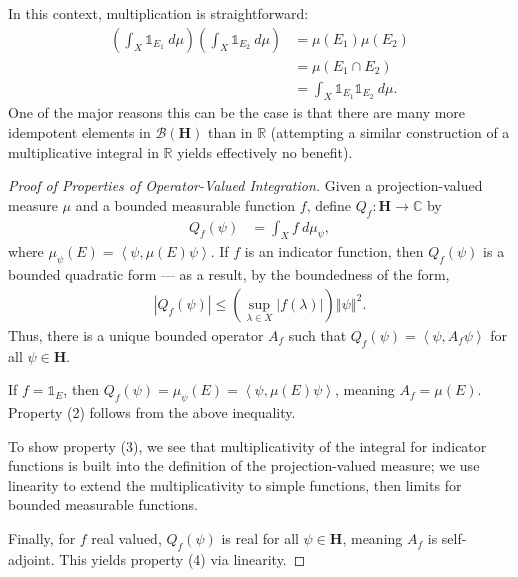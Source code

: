 \documentclass[12pt]{extarticle}
\newcommand{\R}{\mathbb{R}}
\newcommand{\C}{\mathbb{C}}
\newcommand{\iprod}[2]{\left\langle #1,#2\right\rangle}
\newcommand{\norm}[1]{\left\Vert #1\right\Vert}
\theoremstyle{plain}
\theoremstyle{definition}
\theoremstyle{remark}
\renewcommand{\newline}{\hfill\break}
\begin{document}
  In this context, multiplication is straightforward:
  \begin{align*}
    \left(\int_{X}^{} \mathbb{1}_{E_1}\:d\mu\right)\left(\int_{X}^{} \mathbb{1}_{E_2}\:d\mu\right) &= \mu(E_1)\mu(E_2)\\
                                                                                                   &= \mu(E_1 \cap E_2)\\
                                                                                                   &= \int_{X}^{} \mathbb{1}_{E_1}\mathbb{1}_{E_2}\:d\mu.
  \end{align*}
  One of the major reasons this can be the case is that there are many more idempotent elements in $\mathcal{B}(\mathbf{H})$ than in $\R$ (attempting a similar construction of a multiplicative integral in $\R$ yields effectively no benefit).
  \begin{proof}[Proof of Properties of Operator-Valued Integration]
    Given a projection-valued measure $\mu$ and a bounded measurable function $f$, define $Q_{f}: \mathbf{H}\rightarrow \C$ by
    \begin{align*}
      Q_f(\psi) &= \int_{X}^{}f \:d\mu_{\psi},
    \end{align*}
    where $\mu_{\psi}(E) = \iprod{\psi}{\mu(E)\psi}$. If $f$ is an indicator function, then $Q_f(\psi)$ is a bounded quadratic form --- as a result, by the boundedness of the form,
    \begin{align*}
      |Q_f(\psi)| \leq \left(\sup_{\lambda \in X}|f(\lambda)|\right)\norm{\psi}^2.
    \end{align*}
    Thus, there is a unique bounded operator $A_f$ such that $Q_f(\psi) = \iprod{\psi}{A_f\psi}$ for all $\psi \in \mathbf{H}$.\newline

    If $f = \mathbb{1}_E$, then $Q_f(\psi) = \mu_{\psi}(E) = \iprod{\psi}{\mu(E)\psi}$, meaning $A_f = \mu(E)$. Property (2) follows from the above inequality.\newline

    To show property (3), we see that multiplicativity of the integral for indicator functions is built into the definition of the projection-valued measure; we use linearity to extend the multiplicativity to simple functions, then limits for bounded measurable functions.\newline

    Finally, for $f$ real valued, $Q_f(\psi)$ is real for all $\psi \in \mathbf{H}$, meaning $A_f$ is self-adjoint. This yields property (4) via linearity.
  \end{proof}
\end{document}
